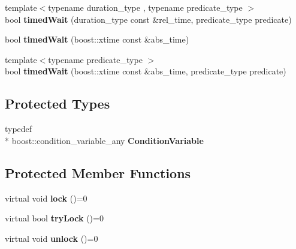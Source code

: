 \begin{DoxyCompactItemize}
\item 
\hypertarget{classcore_1_1threading_1_1_condition_a3863d0dbb2cf1508668e8c627ec642ac}{{\footnotesize template$<$typename duration\-\_\-type , typename predicate\-\_\-type $>$ }\\bool {\bfseries timed\-Wait} (duration\-\_\-type const \&rel\-\_\-time, predicate\-\_\-type predicate)}\label{classcore_1_1threading_1_1_condition_a3863d0dbb2cf1508668e8c627ec642ac}

\item 
\hypertarget{classcore_1_1threading_1_1_condition_a7a5c4e47f11eaf495160be7813e64cde}{bool {\bfseries timed\-Wait} (boost\-::xtime const \&abs\-\_\-time)}\label{classcore_1_1threading_1_1_condition_a7a5c4e47f11eaf495160be7813e64cde}

\item 
\hypertarget{classcore_1_1threading_1_1_condition_a816a417886d207e9ff775b561d33d439}{{\footnotesize template$<$typename predicate\-\_\-type $>$ }\\bool {\bfseries timed\-Wait} (boost\-::xtime const \&abs\-\_\-time, predicate\-\_\-type predicate)}\label{classcore_1_1threading_1_1_condition_a816a417886d207e9ff775b561d33d439}

\end{DoxyCompactItemize}
\subsection*{Protected Types}
\begin{DoxyCompactItemize}
\item 
\hypertarget{classcore_1_1threading_1_1_condition_a4671fdd1ca1492168b652aafc3d57824}{typedef \\*
boost\-::condition\-\_\-variable\-\_\-any {\bfseries Condition\-Variable}}\label{classcore_1_1threading_1_1_condition_a4671fdd1ca1492168b652aafc3d57824}

\end{DoxyCompactItemize}
\subsection*{Protected Member Functions}
\begin{DoxyCompactItemize}
\item 
\hypertarget{classcore_1_1threading_1_1_condition_a263c53c23f71204a68e5e442b723c149}{virtual void {\bfseries lock} ()=0}\label{classcore_1_1threading_1_1_condition_a263c53c23f71204a68e5e442b723c149}

\item 
\hypertarget{classcore_1_1threading_1_1_condition_a4e23bba87819bfe72486ba82cf487f13}{virtual bool {\bfseries try\-Lock} ()=0}\label{classcore_1_1threading_1_1_condition_a4e23bba87819bfe72486ba82cf487f13}

\item 
\hypertarget{classcore_1_1threading_1_1_condition_a65b2596f964e2353182818f2a5fd1e0c}{virtual void {\bfseries unlock} ()=0}\label{classcore_1_1threading_1_1_condition_a65b2596f964e2353182818f2a5fd1e0c}

\end{DoxyCompactItemize}
